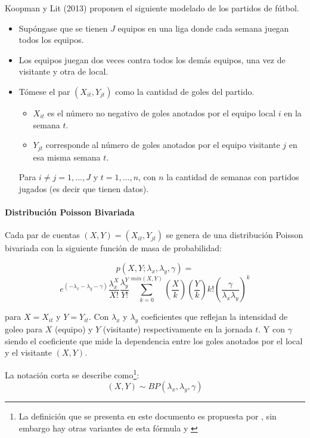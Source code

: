 Koopman y Lit (2013) \cite{koopman2013dynamic} proponen el siguiente modelado de los partidos de fútbol.
\begin{itemize}

	\item Supóngase que se tienen $J$ equipos en una liga donde cada semana juegan todos los equipos.

	\item Los equipos juegan dos veces contra todos los demás equipos, una vez de visitante y otra de local.
	\item Tómese el par $(X_{it},Y_{jt})$ como la cantidad de goles del partido. 
	\begin{itemize}
	
		\item $X_{it}$ es el número no negativo de goles anotados por el equipo local $i$ en la semana $t$.
		\item $Y_{jt}$ corresponde al número de goles anotados por el equipo visitante $j$ en esa misma semana $t$.
	\end{itemize}
		
		Para $i\neq j = 1, ...,J$ y $t=1,...,n$, con $n$ la cantidad de semanas con partidos jugados (es decir que tienen datos).
\end{itemize}

\paragraph{Distribución Poisson Bivariada} %
\label{par:distribucion_poisson_bivariada}
Cada par de cuentas $(X,Y) = (X_{it},Y_{jt})$ se genera de una distribución Poisson bivariada con la siguiente función de masa de probabilidad:
 
 \[p(X,Y;\lambda_x,\lambda_y,\gamma) =\]
  \[e^{(-\lambda_x-\lambda_y-\gamma)}\frac{\lambda^X_x}{X!}\frac{\lambda^Y_y}{Y!}\sum_{k=0}^{min(X,Y)}\left(\frac{X}{k}\right)\left(\frac{Y}{k}\right)k!\left(\frac{\gamma}{\lambda_x\lambda_y}\right)^k \]

 para $X = X_{it}$ y $Y = Y_{it}$.
 Con $\lambda_x$ y $\lambda_y$ coeficientes que reflejan la intensidad de goleo para $X$ (equipo) y $Y$ (visitante) respectivamente en la jornada $t$.
 Y con $\gamma$ siendo el coeficiente que mide la dependencia entre los goles anotados por el local y el visitante $(X,Y)$. 

 La notación corta se describe como\footnote{La definición que se presenta en este documento es propuesta por \cite{koopman2013dynamic}, sin embargo hay otras variantes de esta fórmula \cite{kocherlakota1992bivariate} y \cite{johnson1997discrete}}:
 \boldmath\[(X,Y) \sim BP(\lambda_x,\lambda_y,\gamma)\]\unboldmath 
 

